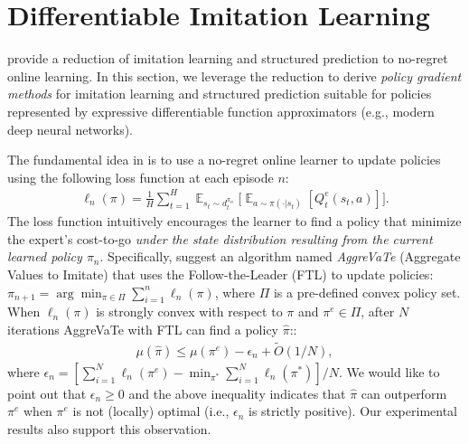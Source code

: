 \documentclass{article}
\newcommand{\BB}[1]{\textcolor{red}{\bf Byron: {#1}}}
\begin{document}
\section{Differentiable Imitation Learning}
\label{sec:alg}
\citet{ross2014reinforcement} provide a reduction of imitation learning and structured prediction to no-regret online learning. In this section, we leverage the reduction to derive \emph{policy gradient methods} for imitation learning and structured prediction suitable for policies represented by expressive differentiable function approximators (e.g., modern deep neural networks).

The fundamental idea in \citet{ross2014reinforcement} is to use a no-regret online learner to update policies using the following loss function at each episode $n$:
\begin{align}
\label{eq:general_loss}
\ell_{n}(\pi) = \frac{1}{H}\sum_{t=1}^H \mathop{\mathbb{E}}_{s_t\sim d_t^{\pi_n}}\Big[\mathop{\mathbb{E}}_{a \sim \pi(\cdot | s_t)}[Q_t^e(s_t,a)]\Big].
\end{align}
The loss function intuitively encourages the learner to find a policy that minimize the expert's cost-to-go \emph{under the state distribution resulting from the current learned policy $\pi_n$}.
Specifically, \citet{ross2014reinforcement} suggest an algorithm named \emph{AggreVaTe} (Aggregate Values to Imitate) that uses the Follow-the-Leader (FTL)\cite{shalev2012online} to update policies:$\pi_{n+1} = \arg\min_{\pi\in\Pi}\sum_{i=1}^{n}\ell_n(\pi)$, %
where $\Pi$ is a pre-defined convex policy set. 
When $\ell_n(\pi)$ is strongly convex with respect to $\pi$ and $\pi^e\in \Pi$, after $N$ iterations AggreVaTe with FTL can find a policy $\hat{\pi}$::
\begin{align}
\label{eq:AggreVaTe_analysis}
\mu(\hat{\pi}) \leq \mu(\pi^e) - \epsilon_n + \tilde{O}({1}/{N}),
\end{align} where $\epsilon_n =[\sum_{i=1}^N\ell_n(\pi^e) - \min_{\pi^*}\sum_{i=1}^N\ell_n(\pi^*)]/N$. We would like to point out that $\epsilon_n\geq 0$ and the above inequality indicates that $\hat{\pi}$ can outperform $\pi^e$ when $\pi^e$ is not (locally) optimal (i.e., $\epsilon_n$ is strictly positive). Our experimental results also support this observation.
\end{document}
